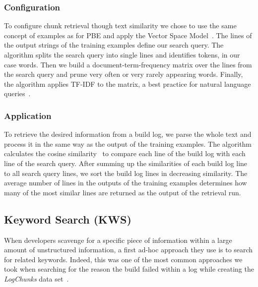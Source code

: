 \subsubsection{Configuration}
To configure chunk retrieval though text similarity we chose to use the same concept of examples as for PBE\@
and apply the Vector Space Model~\cite{schutze2008introduction}.
The lines of the output strings of the training examples define our search query.
The algorithm splits the search query into single lines and identifies tokens, in our case words.
Then we build a document-term-frequency matrix over the lines from the search query and prune very often or very rarely appearing words.
Finally, the algorithm applies TF-IDF to the matrix, a best practice for natural language queries~\cite{lee1997document}.

\subsubsection{Application}
To retrieve the desired information from a build log, we parse the whole text and process it in the same way as the output of the training examples.
The algorithm calculates the cosine similarity~\cite{korenius2007principal} to compare each line of the build log with each line of the search query.
After summing up the similarities of each build log line to all search query lines, we sort the build log lines in decreasing similarity.
The average number of lines in the outputs of the training examples determines how many of the most similar lines are returned as the output of the retrieval run.

\subsection{Keyword Search (KWS)}
\label{sec:expl-skws}
When developers scavenge for a specific piece of information within a large amount of unstructured information, a first ad-hoc approach they use is to search for related keywords.
Indeed, this was one of the most common approaches we took when searching for the reason the build failed within a log while creating the \emph{LogChunks} data set~\cite{logchunks}.

